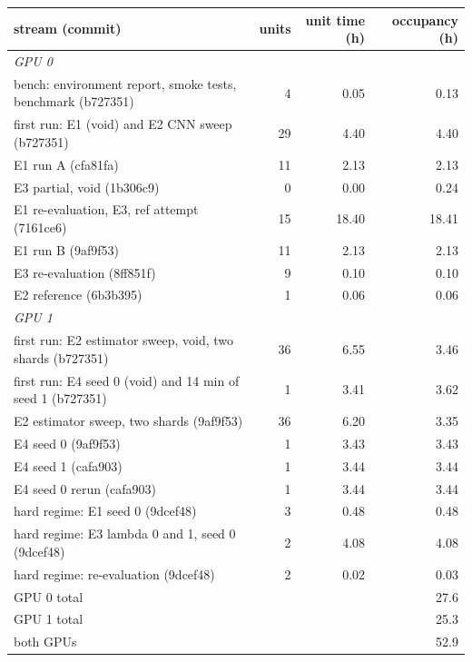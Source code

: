 \begin{tabular}{lrrr}
\toprule
stream (commit) & units & unit time (h) & occupancy (h) \\
\midrule
\multicolumn{4}{l}{\emph{GPU 0}} \\
bench: environment report, smoke tests, benchmark (b727351) & 4 & 0.05 & 0.13 \\
first run: E1 (void) and E2 CNN sweep (b727351) & 29 & 4.40 & 4.40 \\
E1 run A (cfa81fa) & 11 & 2.13 & 2.13 \\
E3 partial, void (1b306c9) & 0 & 0.00 & 0.24 \\
E1 re-evaluation, E3, ref attempt (7161ce6) & 15 & 18.40 & 18.41 \\
E1 run B (9af9f53) & 11 & 2.13 & 2.13 \\
E3 re-evaluation (8ff851f) & 9 & 0.10 & 0.10 \\
E2 reference (6b3b395) & 1 & 0.06 & 0.06 \\
\multicolumn{4}{l}{\emph{GPU 1}} \\
first run: E2 estimator sweep, void, two shards (b727351) & 36 & 6.55 & 3.46 \\
first run: E4 seed 0 (void) and 14 min of seed 1 (b727351) & 1 & 3.41 & 3.62 \\
E2 estimator sweep, two shards (9af9f53) & 36 & 6.20 & 3.35 \\
E4 seed 0 (9af9f53) & 1 & 3.43 & 3.43 \\
E4 seed 1 (cafa903) & 1 & 3.44 & 3.44 \\
E4 seed 0 rerun (cafa903) & 1 & 3.44 & 3.44 \\
hard regime: E1 seed 0 (9dcef48) & 3 & 0.48 & 0.48 \\
hard regime: E3 lambda 0 and 1, seed 0 (9dcef48) & 2 & 4.08 & 4.08 \\
hard regime: re-evaluation (9dcef48) & 2 & 0.02 & 0.03 \\
\midrule
GPU 0 total & & & 27.6 \\
GPU 1 total & & & 25.3 \\
both GPUs & & & 52.9 \\
\bottomrule
\end{tabular}